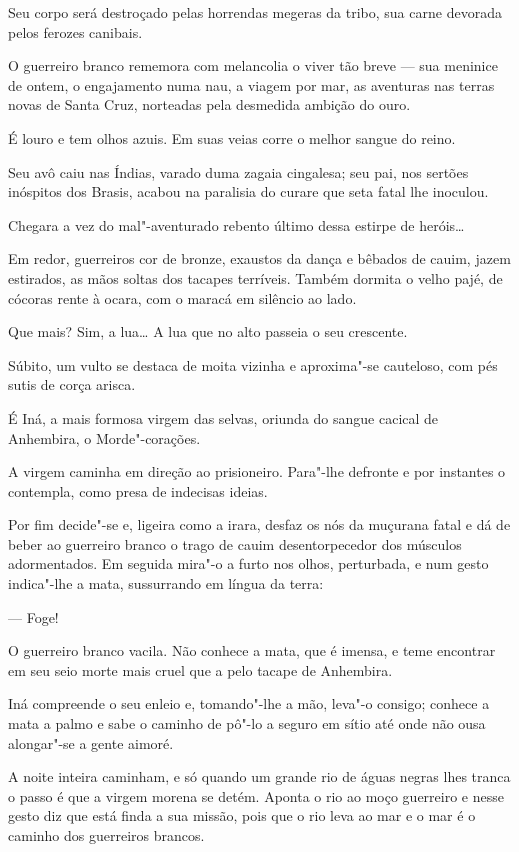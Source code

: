 Seu corpo será destroçado pelas horrendas megeras da tribo, sua carne
devorada pelos ferozes canibais.

O guerreiro branco rememora com melancolia o viver tão breve --- sua
meninice de ontem, o engajamento numa nau, a viagem por mar, as
aventuras nas terras novas de Santa Cruz, norteadas pela desmedida
ambição do ouro.

É louro e tem olhos azuis. Em suas veias corre o melhor sangue do reino.

Seu avô caiu nas Índias, varado duma zagaia cingalesa; seu pai, nos
sertões inóspitos dos Brasis, acabou na paralisia do curare que seta
fatal lhe inoculou.

Chegara a vez do mal"-aventurado rebento último dessa estirpe de
heróis\ldots{}

Em redor, guerreiros cor de bronze, exaustos da dança e bêbados de
cauim, jazem estirados, as mãos soltas dos tacapes terríveis. Também
dormita o velho pajé, de cócoras rente à ocara, com o maracá em silêncio
ao lado.

Que mais? Sim, a lua\ldots{} A lua que no alto passeia o seu crescente.

Súbito, um vulto se destaca de moita vizinha e aproxima"-se cauteloso,
com pés sutis de corça arisca.

É Iná, a mais formosa virgem das selvas, oriunda do sangue cacical de
Anhembira, o Morde"-corações.

A virgem caminha em direção ao prisioneiro. Para"-lhe defronte e por
instantes o contempla, como presa de indecisas ideias.

Por fim decide"-se e, ligeira como a irara, desfaz os nós da muçurana
fatal e dá de beber ao guerreiro branco o trago de cauim desentorpecedor
dos músculos adormentados. Em seguida mira"-o a furto nos olhos,
perturbada, e num gesto indica"-lhe a mata, sussurrando em língua da
terra:

--- Foge!

O guerreiro branco vacila. Não conhece a mata, que é imensa, e teme
encontrar em seu seio morte mais cruel que a pelo tacape de Anhembira.

Iná compreende o seu enleio e, tomando"-lhe a mão, leva"-o consigo;
conhece a mata a palmo e sabe o caminho de pô"-lo a seguro em sítio até
onde não ousa alongar"-se a gente aimoré.

A noite inteira caminham, e só quando um grande rio de águas negras lhes
tranca o passo é que a virgem morena se detém. Aponta o rio ao moço
guerreiro e nesse gesto diz que está finda a sua missão, pois que o rio
leva ao mar e o mar é o caminho dos guerreiros brancos.

